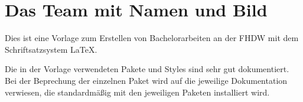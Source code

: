\section{Das Team mit Namen und Bild}

Dies ist eine Vorlage zum Erstellen von Bachelorarbeiten an der FHDW mit dem
Schriftsatzsystem {\LaTeX}.

Die in der Vorlage verwendeten Pakete und Styles sind sehr gut dokumentiert. Bei
der Beprechung der einzelnen Paket wird auf die jeweilige Dokumentation verwiesen, die standardmäßig mit den jeweiligen Paketen installiert wird.
